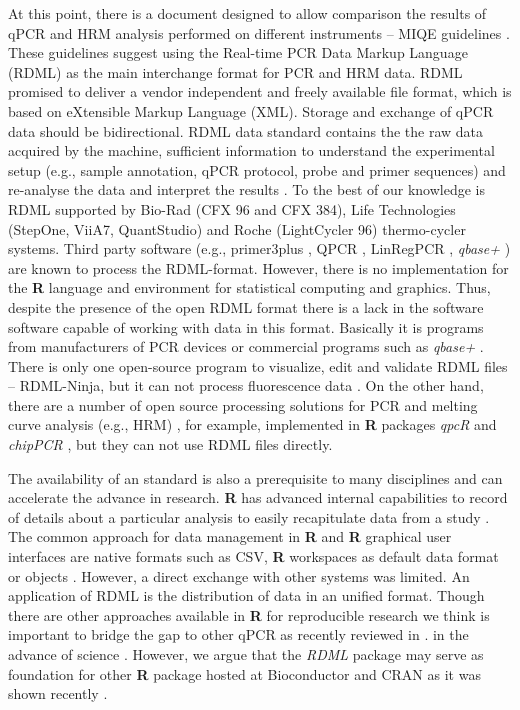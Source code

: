 \documentclass{bioinfo}
\begin{document}
At this point, there is a document designed to allow comparison the results of 
qPCR and HRM analysis performed on different instruments -- MIQE guidelines 
\cite{bustin_miqe_2009, huggett_2013}. These guidelines suggest using the 
Real-time PCR Data Markup Language (RDML) as the main interchange format for PCR 
and HRM data. RDML promised to deliver a vendor independent and freely available 
file format, which is based on eXtensible Markup Language (XML). Storage and 
exchange of qPCR data should be bidirectional. RDML data standard contains the 
the raw data acquired by the machine, sufficient information to understand the 
experimental setup (e.g., sample annotation, qPCR protocol, probe and primer 
sequences) and re-analyse the data and interpret the results 
\cite{lefever_rdml:_2009}. To the best of our knowledge is RDML supported by 
Bio-Rad (CFX 96 and CFX 384), Life Technologies (StepOne, ViiA7, QuantStudio) and 
Roche (LightCycler 96) thermo-cycler systems. Third party software (e.g., 
primer3plus \cite{untergasser_2007}, QPCR \cite{pabinger_2009}, LinRegPCR 
\cite{ruijter_2014}, \textit{qbase+} \cite{hellemans_2007}) are known to process 
the RDML-format. However, there is no implementation for the \textbf{R} language 
and environment for statistical computing and graphics. Thus, despite the 
presence of the open RDML format there is a lack in the software software 
capable of working with data in this format. Basically it is programs from 
manufacturers of PCR devices or commercial programs such as \textit{qbase+} 
\cite{rdml}. There is only one open-source program to visualize, edit and validate RDML files -- RDML-Ninja, but it can not process fluorescence data \cite{rdml-ninja_2015}. On the other hand, there are a number of open source processing 
solutions for PCR and melting curve analysis (e.g., HRM) 
\cite{roediger_RJ_2013,cousins_2012}, for example, implemented in \textbf{R} 
packages \textit{qpcR}\cite{ritz_qpcr:_2008} and \textit{chipPCR} 
\cite{rodiger2015chippcr}, but they can not use RDML files directly.

The availability of an standard is also a prerequisite to many disciplines and 
can accelerate the advance in research. \textbf{R} has advanced internal 
capabilities to record of details about a particular analysis to easily 
recapitulate data from a study \cite{liu_2014}. The common approach for data 
management in \textbf{R} and \textbf{R} graphical user interfaces are native 
formats such as CSV, \textbf{R} workspaces as default data format or objects 
\cite{rodiger_rkward_2012, pabinger_2014, RDCT2014c}. However, a direct exchange 
with other systems was limited. An application of RDML is the distribution of 
data in an unified format. Though there are other approaches available in 
\textbf{R} for reproducible research \cite{Leeper_2014} we think is important to 
bridge the gap to other qPCR as recently reviewed in \cite{pabinger_2014}. in 
the advance of science \cite{gentleman_2004}. However, we argue that the 
\textit{RDML} package may serve as foundation for other \textbf{R} package 
hosted at Bioconductor \cite{gentleman_2004} and CRAN \cite{RCT} as it was shown recently \cite{rodiger2015r}. 
\end{document}
